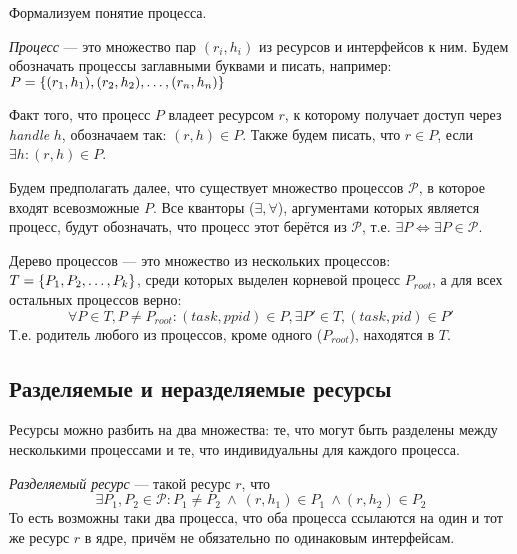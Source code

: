 Формализуем понятие процесса.

\begin{defn}
\emph{Процесс} --- это множество пар $(r_i, h_i)$ из ресурсов и интерфейсов к ним. Будем обозначать процессы заглавными буквами и писать, например: $P = \left\lbrace (r_1, h_1), (r_2, h_2), \ldots, (r_n, h_n) \right\rbrace$
\end{defn}

Факт того, что процесс $P$ владеет ресурсом $r$, к которому получает доступ через \textit{handle} $h$, обозначаем так: $(r, h) \in P$. Также будем писать, что $r \in P$, если $\exists h: (r, h) \in P$.

Будем предполагать далее, что существует множество процессов $\mathcal{P}$, в которое входят всевозможные $P$. Все кванторы ($\exists, \forall$), аргументами которых является процесс, будут обозначать, что процесс этот берётся из $\mathcal{P}$, т.е. $\exists P \Longleftrightarrow \exists P \in \mathcal{P}$.

\begin{defn}
Дерево процессов --- это множество из нескольких процессов: $T = \left\lbrace P_1, P_2, \ldots, P_k \right\rbrace$, среди которых выделен корневой процесс $P_{root}$, а для всех остальных процессов верно:
\begin{equation*}
\forall P \in T, P \neq P_{root}: (task, ppid) \in P, \exists P' \in T, (task, pid) \in P'
\end{equation*}
Т.е. родитель любого из процессов, кроме одного ($P_{root}$), находятся в $T$.
\end{defn}

\subsection{Разделяемые и неразделяемые ресурсы}

Ресурсы можно разбить на два множества: те, что могут быть разделены между несколькими процессами и те, что индивидуальны для каждого процесса.

\begin{defn}
\emph{Разделяемый ресурс} --- такой ресурс $r$, что
\begin{equation*}
\exists P_1, P_2 \in \mathcal{P}: P_1 \neq P_2\ \land\ (r, h_1) \in P_1\ \land (r, h_2) \in P_2
\end{equation*}
 То есть возможны таки два процесса, что оба процесса ссылаются на один и тот же ресурс $r$ в ядре, причём не обязательно по одинаковым интерфейсам.
\end{defn}

